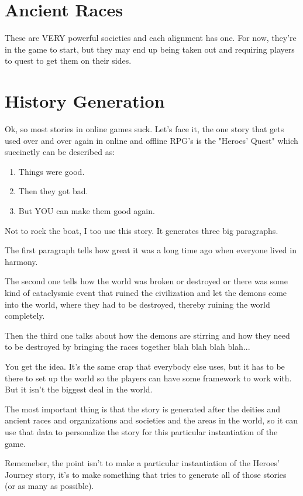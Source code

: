 \section{Ancient Races}

These are VERY powerful societies and each alignment has one. For now, they're
in the game to start, but they may end up being taken out and requiring
players to quest to get them on their sides.

\section{History Generation}

Ok, so most stories in online games suck. Let's face it, the one story that
gets used over and over again in online and offline RPG's is the "Heroes'
Quest" which succinctly can be described as:

\begin{enumerate}

\item Things were good.

\item Then they got bad.

\item But YOU can make them good again.

\end{enumerate}

Not to rock the boat, I too use this story. It generates three big paragraphs.

The first paragraph tells how great it was a long time ago when everyone lived
in harmony.

The second one tells how the world was broken or destroyed or there was some
kind of cataclysmic event that ruined the civilization and let the demons come
into the world, where they had to be destroyed, thereby ruining the world
completely.

Then the third one talks about how the demons are stirring and how they need
to be destroyed by bringing the races together blah blah blah blah...

You get the idea. It's the same crap that everybody else uses, but it has to
be there to set up the world so the players can have some framework to work
with. But it isn't the biggest deal in the world.

The most important thing is that the story is generated after the deities and
ancient races and organizations and societies and the areas in the world, so
it can use that data to personalize the story for this particular
instantiation of the game.

Rememeber, the point isn't to make a particular instantiation of the Heroes'
Journey story, it's to make something that tries to generate all of those
stories (or as many as possible).
